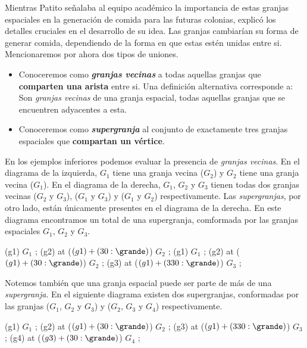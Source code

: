 \noindent Mientras Patito señalaba al equipo académico la importancia de estas granjas espaciales en la generación de comida %
para las futuras colonias, explicó los detalles cruciales en el desarrollo de su idea. Las granjas cambiarían su forma de %
generar comida, dependiendo de la forma en que estas estén unidas entre si. Mencionaremos por ahora dos tipos de uniones.

\begin{itemize}
\item Conoceremos como \textbf{\emph{granjas vecinas}} a todas aquellas granjas que \textbf{comparten una arista} entre si. Una %
definición alternativa corresponde a: Son \emph{granjas vecinas} de una granja espacial, todas aquellas granjas que se encuentren %
adyacentes a esta.
\item Conoceremos como \textbf{\emph{supergranja}} al conjunto de exactamente tres granjas espaciales que \textbf{compartan un vértice}.
\end{itemize}

\vspace{2mm}

\noindent En los ejemplos inferiores podemos evaluar la presencia de \emph{granjas vecinas}. En el diagrama de la izquierda, $G_1$ tiene %
una granja vecina ($G_2$) y $G_2$ tiene una granja vecina ($G_1$). En el diagrama de la derecha, $G_1$, $G_2$ y $G_3$ tienen todas dos granjas %
vecinas ($G_2$ y $G_3$), ($G_1$ y $G_3$) y ($G_1$ y $G_2$) respectivamente. Las \emph{supergranjas}, por otro lado, están únicamente presentes %
en el diagrama de la derecha. En este diagrama encontramos un total de una supergranja, comformada por las granjas espaciales $G_1$, $G_2$ y $G_3$.

\begin{center}
\cultivos
\granja (g1) {$G_1$} ;
\granja (g2) at ($(g1) + (30:\grande)$) {$G_2$} ;
\finfin
\hspace{20mm}
\cultivos
\granja (g1) {$G_1$} ;
\granja (g2) at ($(g1) + (30:\grande)$) {$G_2$} ;
\granja (g3) at ($(g1) + (330:\grande)$) {$G_3$} ;
\finfin
\end{center}

\vspace{2mm}

\noindent Notemos también que una granja espacial puede ser parte de más de una \emph{supergranja}. En el siguiente diagrama existen dos supergranjas, %
conformadas por las granjas ($G_1$, $G_2$ y $G_3$) y ($G_2$, $G_3$ y $G_4$) respectivamente.


\cultivo
\granja (g1) {$G_1$} ;
\granja (g2) at ($(g1) + (30:\grande)$) {$G_2$} ;
\granja (g3) at ($(g1) + (330:\grande)$) {$G_3$} ;
\granja (g4) at ($(g3) + (30:\grande)$) {$G_4$} ;
\fin

